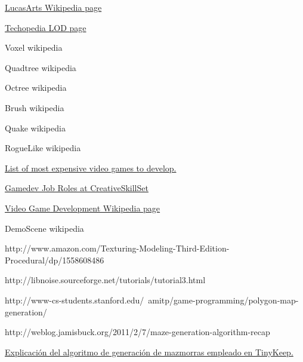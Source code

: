 \begin{thebibliography}{99}


 \href{https://es.wikipedia.org/wiki/LucasArts}{LucasArts Wikipedia page}

 \href{http://www.techopedia.com/definition/11791/level-of-detail-lod}{Techopedia LOD page}

 Voxel wikipedia

 Quadtree wikipedia

 Octree wikipedia

 Brush wikipedia

 Quake wikipedia

 RogueLike wikipedia

 \href{https://en.wikipedia.org/wiki/List_of_most_expensive_video_games_to_develop}{List of most expensive video games to develop.}

 \href{http://creativeskillset.org/creative_industries/games/job_roles}{Gamedev Job Roles at CreativeSkillSet}

 \href{https://en.wikipedia.org/wiki/Video_game_development#Roles}{Video Game Development Wikipedia page}

 DemoScene wikipedia

 http://www.amazon.com/Texturing-Modeling-Third-Edition-Procedural/dp/1558608486

 http://libnoise.sourceforge.net/tutorials/tutorial3.html

 http://www-cs-students.stanford.edu/~amitp/game-programming/polygon-map-generation/

 http://weblog.jamisbuck.org/2011/2/7/maze-generation-algorithm-recap

 \href{http://www.reddit.com/r/gamedev/comments/1dlwc4/procedural_dungeon_generation_algorithm_explained/}{Explicación del algoritmo de generación de mazmorras empleado en TinyKeep.}

\end{thebibliography}







